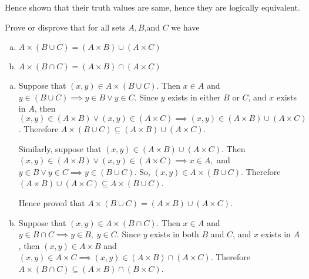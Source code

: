 \documentclass[addpoints]{exam}
\newenvironment{problem}[2][Problem]{\begin{trivlist}
\item[\hskip \labelsep {\bfseries #1}\hskip \labelsep {\bfseries #2.}]}{\end{trivlist}}
\begin{document}
\begin{sloppypar}
\begin{questions}
\begin{solution}
                Hence shown that their truth values are same, hence they are logically equivalent.
        
        \end{solution}
    \end{questions}
    \pagebreak
    \begin{problem}{12}
    Prove or disprove that for all sets $A,B$,and $C$ we have
    \begin{enumerate}[(a)]
        \item $A \times (B \cup C) = (A \times B) \cup (A \times C)$
        \item $A \times (B \cap C) = (A \times B) \cap (A \times C)$
    \end{enumerate}
    \end{problem}
    
    \begin{questions}
        \question
        \begin{solution}
            
            \begin{enumerate}[(a)]
                \item Suppose that $ (x, y) \in A \times (B \cup C) $. Then $ x \in A $ and $ y \in (B \cup C) \implies y \in B \lor y \in C$. Since $y$ exists in either $B$ or $C$, and $x$ exists in $A$, then $ (x, y) \in (A \times B) \lor (x, y) \in (A \times C) \implies (x, y) \in (A \times B) \cup (A \times C) $. Therefore $ A \times (B \cup C) \subseteq (A \times B) \cup (A \times C) $.
                
                Similarly, suppose that $ (x, y) \in (A \times B) \cup (A \times C) $. Then $ (x, y) \in (A \times B) \lor (x, y) \in (A \times C) \implies x \in A, $ and $ y \in B \lor y \in C \implies y \in (B \cup C) $. So, $ (x, y) \in A \times (B \cup C) $. Therefore $ (A \times B) \cup (A \times C) \subseteq A \times (B \cup C) $. 

                Hence proved that $ A \times (B \cup C) = (A \times B) \cup (A \times C) $.
                
                \item Suppose that $ (x, y) \in A \times (B \cap C) $. Then $ x \in A $ and $ y \in B \cap C \implies y \in B, \; y \in C$. Since $y$ exists in both $B$ and $C$, and $x$ exists in $A$, then $ (x, y) \in A \times B $ and $ (x, y) \in A \times C \implies (x, y) \in (A \times B) \cap (A \times C)$. Therefore $ A \times (B \cap C) \subseteq (A \times B) \cap (B \times C) $.
                

\end{enumerate}
\end{solution}
\end{questions}
\end{sloppypar}
\end{document}
